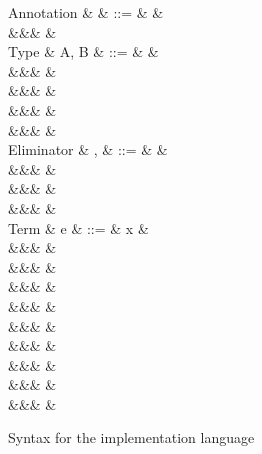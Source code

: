 \begin{figure}
\begin{syntaxfig}
\mbox{Annotation}
&
\alpha
&
::=
&
\true
&
\\
&&&
\false
&
\\[2mm]
\mbox{Type}
&
A, B
&
::=
&
\tyBool
&
\\
&&&
\tyInt
&
\\
&&&
\tyList
&
\\
&&&
&
\\
&&&
&
\\[2mm]
\mbox{Eliminator}
&
\sigma, \tau
&
::=
&
&
\\
&&&
&
\\
&&&
&
\\
&&&
&
\\[2mm]
\mbox{Term}
&
e
&
::=
&
x
&
\\
&&&
\annot{\exTrue}{\alpha} \mid \annot{\exFalse}{\alpha}
&
\\
&&&
&
\\
&&&
&
\\
&&&
&
\\
&&&
&
\\
&&&
&
\\
&&&
\annot{\exNil}{\alpha}
&
\\
&&&
&
\\
&&&
&
\end{syntaxfig}
\caption{Syntax for the implementation language}
\label{fig:impl-language:syntax}
\end{figure}
